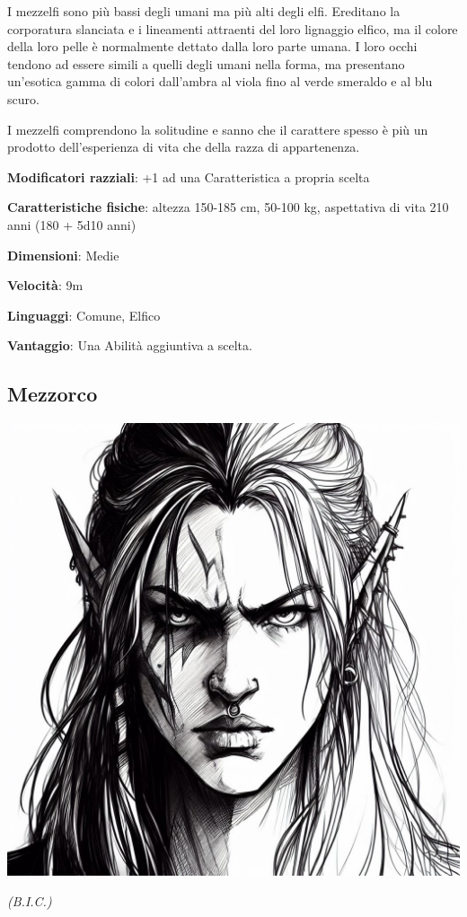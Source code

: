 \begin{multicols}{2}
I mezzelfi sono più bassi degli umani ma più alti degli elfi. Ereditano la corporatura slanciata e i lineamenti attraenti del loro lignaggio elfico, ma il colore della loro pelle è normalmente dettato dalla loro parte umana. I loro occhi tendono ad essere simili a quelli degli umani nella forma, ma presentano un'esotica gamma di colori dall'ambra al viola fino al verde smeraldo e al blu scuro.

I mezzelfi comprendono la solitudine e sanno che il carattere spesso è più un prodotto dell'esperienza di vita che della razza di appartenenza.

\textbf{Modificatori razziali}: +1 ad una Caratteristica a propria scelta

\textbf{Caratteristiche fisiche}: altezza 150-185 cm, 50-100 kg, aspettativa di vita 210 anni (180 + 5d10 anni)

\textbf{Dimensioni}: Medie

\textbf{Velocità}: 9m

\textbf{Linguaggi}: Comune, Elfico

\textbf{Vantaggio}: Una Abilità aggiuntiva a scelta.


\subsection{Mezzorco}\label{mezzorco}

\begin{center}
\includegraphics[height=0.7\linewidth]{immagini/half-orc2-ai.png}

\emph{(B.I.C.)}
\end{center}


\end{multicols}
